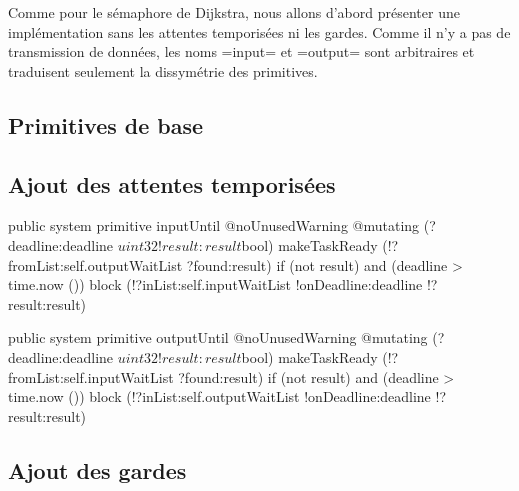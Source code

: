 
Comme pour le sémaphore de Dijkstra, nous allons d'abord présenter une implémentation sans les attentes temporisées ni les gardes. Comme il n'y a pas de transmission de données, les noms \plm=input= et \plm=output= sont arbitraires et traduisent seulement la dissymétrie des primitives.

\subsection{Primitives de base}

\begin{PLM}
struct $rendezVous {
  var inputWaitList = $taskList ()
  var outputWaitList = $taskList ()

  public system primitive input @mutating () {
    makeTaskReady (!?fromList:self.outputWaitList ?found:let found)
    if not found {
      block (!?inList:self.inputWaitList)
    }
  }

  public system primitive output @mutating () {
    makeTaskReady (!?fromList:self.inputWaitList ?found:let found)
    if not found {
      block (!?inList:self.outputWaitList)
    }
  }
\end{PLM}

\subsection{Ajout des attentes temporisées}


\begin{PLM}
public system primitive
inputUntil @noUnusedWarning @mutating (?deadline:deadline $uint32
                                       !result: result $bool) {
  makeTaskReady (!?fromList:self.outputWaitList ?found:result)
  if (not result) and (deadline > time.now ()) { 
    block (!?inList:self.inputWaitList !onDeadline:deadline !?result:result)
  }
}

public system primitive
outputUntil @noUnusedWarning @mutating (?deadline:deadline $uint32
                                        !result: result $bool) {
  makeTaskReady (!?fromList:self.inputWaitList ?found:result)
  if (not result) and (deadline > time.now ()) { 
    block (!?inList:self.outputWaitList !onDeadline:deadline !?result:result)
  }
}
\end{PLM}

\subsection{Ajout des gardes}

